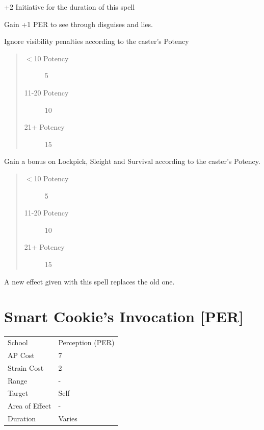 \documentclass[11pt,a4paper,twocolumn]{book}
\begin{document}
\begin{compactitem}
	\item +2 Initiative for the duration of this spell
	\item Gain +1 PER to see through disguises and lies.
	\item Ignore visibility penalties according to the caster's Potency
	\begin{quote}
		\begin{description}
			\item[$<$10 Potency] 	5
			\item[11-20 Potency] 	10
			\item[21+ Potency] 	15
		\end{description}
	\end{quote}
	\item Gain a bonus on Lockpick, Sleight and Survival according to the caster's Potency.	
	\begin{quote}
		\begin{description}
			\item[$<$10 Potency] 	5
			\item[11-20 Potency] 	10
			\item[21+ Potency] 	15
		\end{description}
	\end{quote}
\end{compactitem}

A new effect given with this spell replaces the old one.

\section*{Smart Cookie's Invocation [PER]}
{
	\begin{tabu} to 75mm{| X[l,4] | X[l,7] |}
		\hline
		School 			& Perception (PER) 	\\
        AP Cost	      	& 7 				\\
        Strain Cost     & 2 				\\
        Range     		& - 				\\
        Target      	& Self 				\\
        Area of Effect  & - 	 			\\
        Duration     	& Varies 			\\ \hline
	\end{tabu}
		
}
\end{document}
